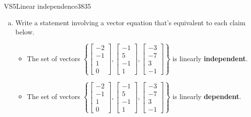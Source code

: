 \begin{exercise}{VS5}{Linear independence}{3835} 
\begin{exerciseStatement} 

\begin{enumerate}[(a)]
\item  

 Write a statement involving a vector equation that's equivalent to each claim below. 

 

\begin{itemize}
\item  

 The set of vectors \(\left\{ \left[\begin{array}{c}
-2 \\
-1 \\
1 \\
0
\end{array}\right] , \left[\begin{array}{c}
-1 \\
5 \\
-1 \\
1
\end{array}\right] , \left[\begin{array}{c}
-3 \\
-7 \\
3 \\
-1
\end{array}\right] \right\}\) is linearly \textbf{independent}. 

 
\item  

 The set of vectors \(\left\{ \left[\begin{array}{c}
-2 \\
-1 \\
1 \\
0
\end{array}\right] , \left[\begin{array}{c}
-1 \\
5 \\
-1 \\
1
\end{array}\right] , \left[\begin{array}{c}
-3 \\
-7 \\
3 \\
-1
\end{array}\right] \right\}\) is linearly \textbf{dependent}. 

 
\end{itemize}


\end{enumerate}
\end{exerciseStatement}
\end{exercise}
